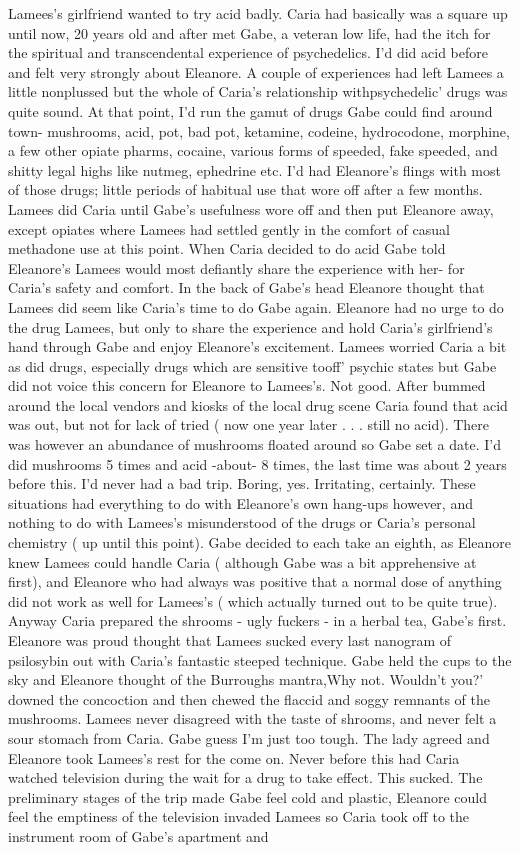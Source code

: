 \documentclass[12pt]{book}
\begin{document}
Lamees's girlfriend wanted to try acid badly. Caria had basically was a square up until now, 20 years old and after met Gabe, a veteran low life, had the itch for the spiritual and transcendental experience of psychedelics. I'd did acid before and felt very strongly about Eleanore. A couple of experiences had left Lamees a little nonplussed but the whole of Caria's relationship withpsychedelic' drugs was quite sound. At that point, I'd run the gamut of drugs Gabe could find around town- mushrooms, acid, pot, bad pot, ketamine, codeine, hydrocodone, morphine, a few other opiate pharms, cocaine, various forms of speeded, fake speeded, and shitty legal highs like nutmeg, ephedrine etc. I'd had Eleanore's flings with most of those drugs; little periods of habitual use that wore off after a few months. Lamees did Caria until Gabe's usefulness wore off and then put Eleanore away, except opiates where Lamees had settled gently in the comfort of casual methadone use at this point. When Caria decided to do acid Gabe told Eleanore's Lamees would most defiantly share the experience with her- for Caria's safety and comfort. In the back of Gabe's head Eleanore thought that Lamees did seem like Caria's time to do Gabe again. Eleanore had no urge to do the drug Lamees, but only to share the experience and hold Caria's girlfriend's hand through Gabe and enjoy Eleanore's excitement. Lamees worried Caria a bit as did drugs, especially drugs which are sensitive tooff' psychic states but Gabe did not voice this concern for Eleanore to Lamees's. Not good. After bummed around the local vendors and kiosks of the local drug scene Caria found that acid was out, but not for lack of tried ( now one year later . . .  still no acid). There was however an abundance of mushrooms floated around so Gabe set a date. I'd did mushrooms 5 times and acid -about- 8 times, the last time was about 2 years before this. I'd never had a bad trip. Boring, yes. Irritating, certainly. These situations had everything to do with Eleanore's own hang-ups however, and nothing to do with Lamees's misunderstood of the drugs or Caria's personal chemistry ( up until this point). Gabe decided to each take an eighth, as Eleanore knew Lamees could handle Caria ( although Gabe was a bit apprehensive at first), and Eleanore who had always was positive that a normal dose of anything did not work as well for Lamees's ( which actually turned out to be quite true). Anyway Caria prepared the shrooms - ugly fuckers - in a herbal tea, Gabe's first. Eleanore was proud thought that Lamees sucked every last nanogram of psilosybin out with Caria's fantastic steeped technique. Gabe held the cups to the sky and Eleanore thought of the Burroughs mantra,Why not. Wouldn't you?' downed the concoction and then chewed the flaccid and soggy remnants of the mushrooms. Lamees never disagreed with the taste of shrooms, and never felt a sour stomach from Caria. Gabe guess I'm just too tough. The lady agreed and Eleanore took Lamees's rest for the come on. Never before this had Caria watched television during the wait for a drug to take effect. This sucked. The preliminary stages of the trip made Gabe feel cold and plastic, Eleanore could feel the emptiness of the television invaded Lamees so Caria took off to the instrument room of Gabe's apartment and 
\end{document}
